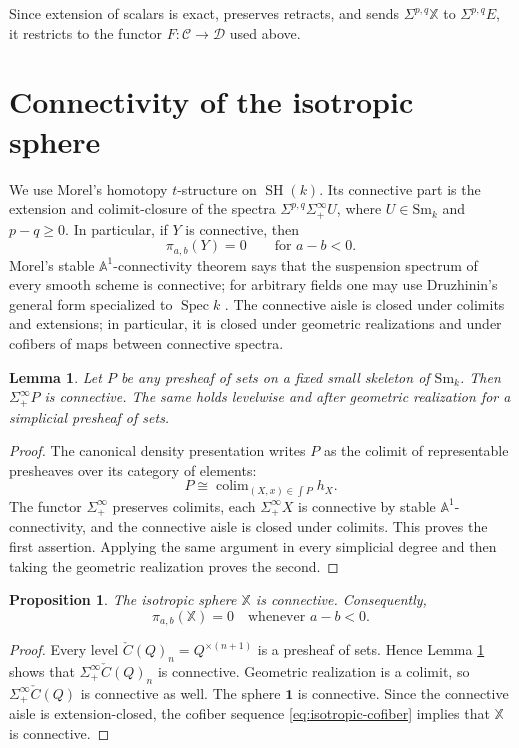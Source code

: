 \documentclass[11pt]{amsart}
\numberwithin{equation}{section}
\newtheorem{proposition}[theorem]{Proposition}
\newtheorem{lemma}[theorem]{Lemma}
\theoremstyle{definition}
\theoremstyle{remark}
\DeclareMathOperator{\Spec}{Spec}
\DeclareMathOperator{\SH}{SH}
\newcommand{\X}{\mathbb X}
\newcommand{\one}{\mathbf 1}
\newcommand{\C}{\mathcal C}
\newcommand{\D}{\mathcal D}
\newcommand{\Sm}{\mathrm{Sm}}
\begin{document}
Since extension of scalars is exact, preserves retracts, and sends
$\Sigma^{p,q}\X$ to $\Sigma^{p,q}E$, it restricts to the functor
$F\colon\C\to\D$ used above.

\section{Connectivity of the isotropic sphere}\label{sec:connectivity}

We use Morel's homotopy $t$-structure on $\SH(k)$.  Its connective part is
the extension and colimit-closure of the spectra
$\Sigma^{p,q}\Sigma^\infty_+U$, where $U\in\Sm_k$ and $p-q\geq0$.  In
particular, if $Y$ is connective, then
\[
  \pi_{a,b}(Y)=0
  \qquad\text{for }a-b<0.
\]
Morel's stable $\mathbb A^1$-connectivity theorem
\cite{MorelConnectivity} says that the suspension spectrum of every smooth
scheme is connective; for arbitrary fields one may use Druzhinin's general
form specialized to $\Spec k$ \cite[Theorem~1]{DruzhininConnectivity}.
The connective aisle is closed under colimits and extensions; in particular,
it is closed under geometric realizations and under cofibers of maps between
connective spectra.

\begin{lemma}
\label{lem:presheaf-connective}
Let $P$ be any presheaf of sets on a fixed small skeleton of $\Sm_k$.  Then
$\Sigma^\infty_+P$ is connective.  The same holds levelwise and after
geometric realization for a simplicial presheaf of sets.
\end{lemma}

\begin{proof}
The canonical density presentation writes $P$ as the colimit of representable
presheaves over its category of elements:
\[
  P\cong\mathop{\operatorname{colim}}_{(X,x)\in\int P}h_X.
\]
The functor $\Sigma^\infty_+$ preserves colimits, each
$\Sigma^\infty_+X$ is connective by stable $\mathbb A^1$-connectivity, and
the connective aisle is closed under colimits.  This proves the first
assertion.  Applying the same argument in every simplicial degree and then
taking the geometric realization proves the second.
\end{proof}

\begin{proposition}
\label{prop:X-connective}
The isotropic sphere $\X$ is connective.  Consequently,
\[
  \pi_{a,b}(\X)=0
  \quad\text{whenever }a-b<0.
\]
\end{proposition}

\begin{proof}
Every level $\check C(Q)_n=Q^{\times(n+1)}$ is a presheaf of sets.  Hence Lemma 
\ref{lem:presheaf-connective} shows that
$\Sigma^\infty_+\check C(Q)_n$ is connective.  Geometric realization is a
colimit, so $\Sigma^\infty_+\check C(Q)$ is connective as well.  The sphere
$\one$ is connective.  Since the connective aisle is extension-closed, the
cofiber sequence \eqref{eq:isotropic-cofiber} implies that $\X$ is
connective.
\end{proof}
\end{document}
